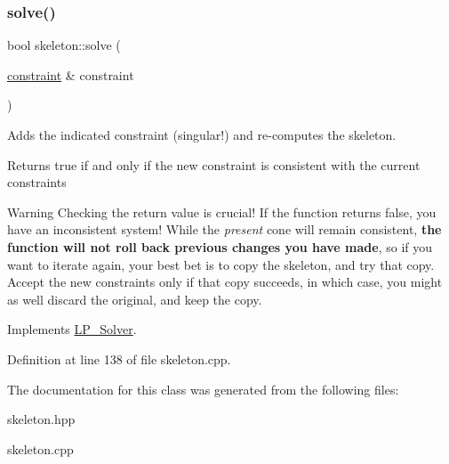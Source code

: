\subsubsection{\texorpdfstring{solve()}{solve()}\hspace{0.1cm}{\footnotesize\ttfamily [2/2]}}
{\footnotesize\ttfamily bool skeleton\+::solve (\begin{DoxyParamCaption}\item[{\hyperlink{classconstraint}{constraint} \&}]{constraint }\end{DoxyParamCaption})\hspace{0.3cm}{\ttfamily [virtual]}}



Adds the indicated constraint (singular!) and re-\/computes the skeleton. 

\begin{DoxyReturn}{Returns}
{\ttfamily true} if and only if the new constraint is consistent with the current constraints
\end{DoxyReturn}
\begin{DoxyWarning}{Warning}
Checking the return value is crucial! If the function returns {\ttfamily false}, you have an inconsistent system! While the {\itshape present} cone will remain consistent, {\bfseries the function will not roll back previous changes you have made}, so if you want to iterate again, your best bet is to copy the skeleton, and try that copy. Accept the new constraints only if that copy succeeds, in which case, you might as well discard the original, and keep the copy. 
\end{DoxyWarning}


Implements \hyperlink{class_l_p___solver_abd84374c52124116becc8924dc74e12d}{L\+P\+\_\+\+Solver}.



Definition at line 138 of file skeleton.\+cpp.



The documentation for this class was generated from the following files\+:\begin{DoxyCompactItemize}
\item 
skeleton.\+hpp\item 
skeleton.\+cpp\end{DoxyCompactItemize}
